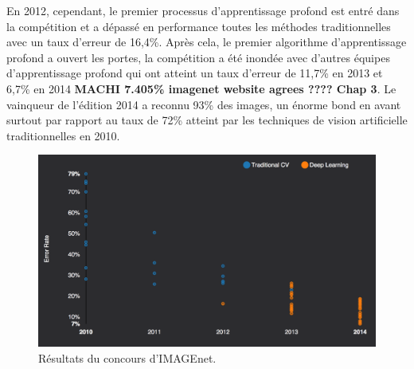 	En 2012, cependant, le premier processus d'apprentissage profond est entré dans la compétition et a dépassé en performance toutes les méthodes traditionnelles avec un taux d'erreur de 16,4\%. 
	Après cela, le premier algorithme d'apprentissage profond a ouvert les portes, la compétition a été inondée avec d'autres équipes d'apprentissage profond qui ont atteint un taux d'erreur de 11,7\% en 2013 et 6,7\% en 2014 \textbf{MACHI 7.405\% imagenet website agrees ???? Chap 3}. Le vainqueur de l'édition 2014 a reconnu 93\% des images, un énorme bond en avant surtout par rapport au taux de 72\% atteint par les techniques de vision artificielle traditionnelles en 2010.


\begin{figure}[H]
	\centering
		\includegraphics[width=5in]{Figures/clairifaiIMAGENET.png}
	\caption[An Electron]{Résultats du concours d'IMAGEnet.}
	\label{fig:Electron}
\end{figure}